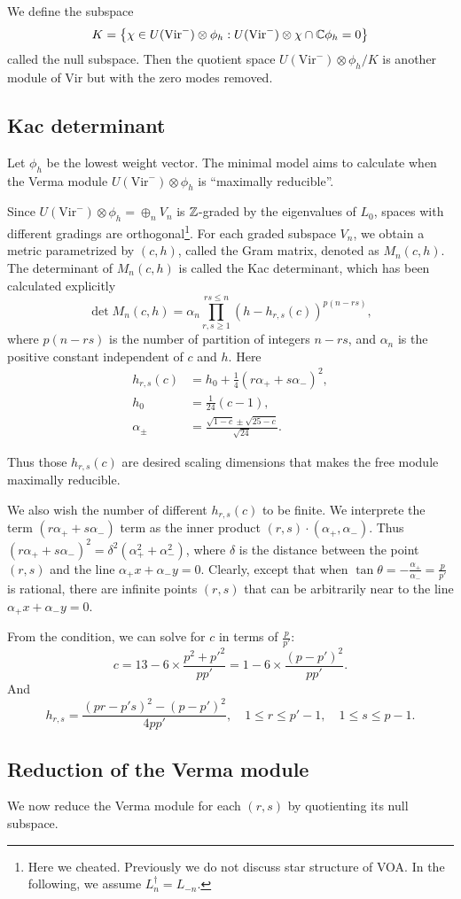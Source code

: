 \documentclass{article}
\begin{document}
We define the subspace
\[
K = \left\{\chi\in  U(\mathrm{Vir}^-)\otimes \phi_h: U(\mathrm{Vir}^-)\otimes \chi\cap \mathbb{C}\phi_h = 0\right\}
\]
called the null subspace. Then the quotient space $U(\mathrm{Vir}^-)\otimes \phi_h/K$ is another module of $\mathrm{Vir}$ but with the zero modes removed.

\subsection{Kac determinant}
Let $\phi_h$ be the lowest weight vector. The minimal model aims to calculate when the Verma module $U(\mathrm{Vir}^-)\otimes \phi_h$ is ``maximally reducible''. 

Since $U(\mathrm{Vir}^-)\otimes \phi_h = \oplus_{n}V_n$ is $\mathbb{Z}$-graded by the eigenvalues of $L_0$, spaces with different gradings are orthogonal\footnote{Here we cheated. Previously we do not discuss star structure of VOA. In the following, we assume $L_n^\dagger = L_{-n}$.}. For each graded subspace $V_n$, we obtain a metric parametrized by $(c,h)$, called the Gram matrix, denoted as $M_n(c,h)$. The determinant of $M_n(c,h)$ is called the Kac determinant, which has been calculated explicitly
\[
\det{M_n(c,h)} = \alpha_n \prod_{r,s\geq 1}^{rs\leq n}\left(h-h_{r,s}(c)\right)^{p(n-rs)},
\]
where $p(n-rs)$ is the number of partition of integers $n-rs$, and $\alpha_n$ is the positive constant independent of $c$ and $h$. Here
\begin{align*}
    h_{r,s}(c) &= h_0 + \frac{1}{4}\left(r\alpha_++s\alpha_-\right)^2,\\
    h_0 &= \frac{1}{24}(c-1),\\
    \alpha_\pm &= \frac{\sqrt{1-c}\pm \sqrt{25-c}}{\sqrt{24}}.
\end{align*}

Thus those $h_{r,s}(c)$ are desired scaling dimensions that makes the free module maximally reducible.

We also wish the number of different $h_{r,s}(c)$ to be finite. We interprete the term $(r\alpha_++s\alpha_-)$ term as the inner product $(r,s)\cdot (\alpha_+,\alpha_-)$. Thus $(r\alpha_++s\alpha_-)^2 = \delta^2(\alpha_+^2+\alpha_-^2)$, where $\delta$ is the distance between the point $(r,s)$ and the line $\alpha_+ x+ \alpha_- y = 0$. Clearly, except that when $\tan\theta = -\frac{\alpha_+}{\alpha_-} = \frac{p}{p'}$ is rational, there are infinite points $(r,s)$ that can be arbitrarily near to the line $\alpha_+ x+ \alpha_- y = 0$.

From the condition, we can solve for $c$ in terms of $\frac{p}{p'}$:
\[
c = 13 - 6\times \frac{p^2+p'^2}{pp'} = 1- 6\times \frac{(p-p')^2}{pp'}.
\]
And
\[
h_{r,s} = \frac{(pr-p's)^2 - (p-p')^2}{4pp'},\quad 1\leq r \leq p'-1,\quad 1\leq s \leq p-1.
\]

\subsection{Reduction of the Verma module}
We now reduce the Verma module for each $(r,s)$ by quotienting its null subspace.




\end{document}
